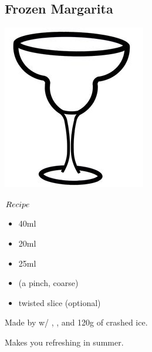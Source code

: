 \subsection{Frozen Margarita}
\vspace{-7mm}
\hspace{48mm}
\includegraphics[scale=.05]{cocktail_glass_snow.jpg}
\vspace{2.5mm}
\begin{itembox}[l]{\boldmath $Recipe$}
\begin{itemize}
\setlength{\parskip}{0cm}
\setlength{\itemsep}{0cm}
\item \teq 40ml
\item \wc 20ml
\item \limj 25ml
\item \salt (a pinch, coarse)
\item \lime twisted slice (optional)
\end{itemize}
\vspace{-4mm}
Made by \blend w/ \teq
\hspace{-1mm}, \wc
\hspace{-1mm}, \limj and 120g of crashed ice.
\end{itembox}
Makes you refreshing in summer.
